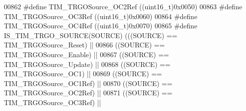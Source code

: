 \begin{DoxyCode}
00862 \textcolor{preprocessor}{#}\textcolor{preprocessor}{define} \textcolor{preprocessor}{TIM\_TRGOSource\_OC2Ref}              \textcolor{preprocessor}{(}\textcolor{preprocessor}{(}\textcolor{preprocessor}{uint16\_t}\textcolor{preprocessor}{)}0x0050\textcolor{preprocessor}{)}
00863 \textcolor{preprocessor}{#}\textcolor{preprocessor}{define} \textcolor{preprocessor}{TIM\_TRGOSource\_OC3Ref}              \textcolor{preprocessor}{(}\textcolor{preprocessor}{(}\textcolor{preprocessor}{uint16\_t}\textcolor{preprocessor}{)}0x0060\textcolor{preprocessor}{)}
00864 \textcolor{preprocessor}{#}\textcolor{preprocessor}{define} \textcolor{preprocessor}{TIM\_TRGOSource\_OC4Ref}              \textcolor{preprocessor}{(}\textcolor{preprocessor}{(}\textcolor{preprocessor}{uint16\_t}\textcolor{preprocessor}{)}0x0070\textcolor{preprocessor}{)}
00865 \textcolor{preprocessor}{#}\textcolor{preprocessor}{define} \textcolor{preprocessor}{IS\_TIM\_TRGO\_SOURCE}\textcolor{preprocessor}{(}\textcolor{preprocessor}{SOURCE}\textcolor{preprocessor}{)} \textcolor{preprocessor}{(}\textcolor{preprocessor}{(}\textcolor{preprocessor}{(}\textcolor{preprocessor}{SOURCE}\textcolor{preprocessor}{)} \textcolor{preprocessor}{==} TIM_TRGOSource_Reset\textcolor{preprocessor}{)} \textcolor{preprocessor}{||}
00866                                     \textcolor{preprocessor}{(}\textcolor{preprocessor}{(}\textcolor{preprocessor}{SOURCE}\textcolor{preprocessor}{)} \textcolor{preprocessor}{==} TIM_TRGOSource_Enable\textcolor{preprocessor}{)} \textcolor{preprocessor}{||}
00867                                     \textcolor{preprocessor}{(}\textcolor{preprocessor}{(}\textcolor{preprocessor}{SOURCE}\textcolor{preprocessor}{)} \textcolor{preprocessor}{==} TIM_TRGOSource_Update\textcolor{preprocessor}{)} \textcolor{preprocessor}{||}
00868                                     \textcolor{preprocessor}{(}\textcolor{preprocessor}{(}\textcolor{preprocessor}{SOURCE}\textcolor{preprocessor}{)} \textcolor{preprocessor}{==} TIM_TRGOSource_OC1\textcolor{preprocessor}{)} \textcolor{preprocessor}{||}
00869                                     \textcolor{preprocessor}{(}\textcolor{preprocessor}{(}\textcolor{preprocessor}{SOURCE}\textcolor{preprocessor}{)} \textcolor{preprocessor}{==} TIM_TRGOSource_OC1Ref\textcolor{preprocessor}{)} \textcolor{preprocessor}{||}
00870                                     \textcolor{preprocessor}{(}\textcolor{preprocessor}{(}\textcolor{preprocessor}{SOURCE}\textcolor{preprocessor}{)} \textcolor{preprocessor}{==} TIM_TRGOSource_OC2Ref\textcolor{preprocessor}{)} \textcolor{preprocessor}{||}
00871                                     \textcolor{preprocessor}{(}\textcolor{preprocessor}{(}\textcolor{preprocessor}{SOURCE}\textcolor{preprocessor}{)} \textcolor{preprocessor}{==} TIM_TRGOSource_OC3Ref\textcolor{preprocessor}{)} \textcolor{preprocessor}{||}

\end{DoxyCode}
